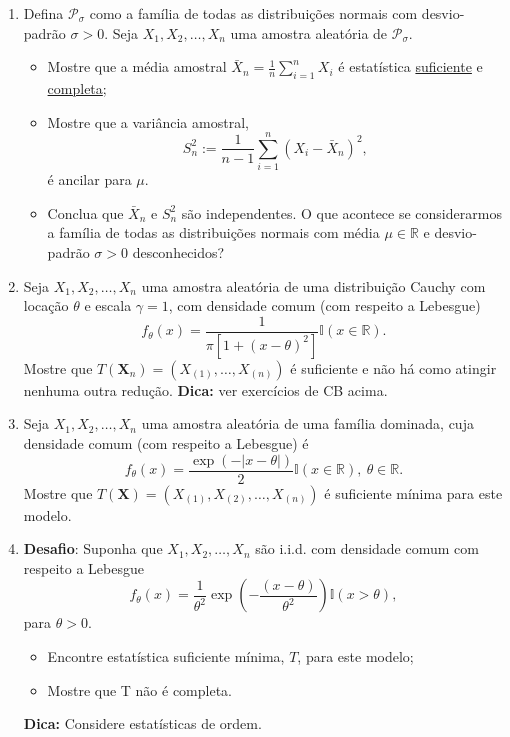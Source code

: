 \documentclass[a4paper,10pt, notitlepage]{report}
\newcommand{\rs}{X_1, X_2, \ldots, X_n} %
\newcommand{\ods}{X_{(1)}, X_{(2)}, \ldots, X_{(n)} } %
\newcommand{\bX}{\boldsymbol{X}} %
\begin{document}
\begin{enumerate}
    \item Defina $\mathcal{P}_\sigma$ como a família de todas as distribuições normais com desvio-padrão $\sigma >0$. Seja $\rs$ uma amostra aleatória de $\mathcal{P}_\sigma$.
    \begin{itemize}
        \item Mostre que a média amostral $\bar{X}_n = \frac{1}{n}\sum_{i=1}^n X_i$ é estatística \underline{suficiente} e \underline{completa};
        \item Mostre que a variância amostral,
        $$S_n^2 := \frac{1}{n-1} \sum_{i=1}^n \left(X_i - \bar{X}_n\right)^2,$$
        é ancilar para $\mu$.
        \item Conclua que $\bar{X}_n$ e $S_n^2$ são independentes. O que acontece se considerarmos a família de todas as distribuições normais com média $\mu \in \mathbb{R}$ e desvio-padrão $\sigma >0$ desconhecidos?
    \end{itemize}
    \item Seja $\rs$ uma amostra aleatória de uma distribuição Cauchy com locação $\theta$ e escala $\gamma = 1$, com densidade comum (com respeito a Lebesgue)
    $$ f_\theta(x) = \frac{1}{\pi [ 1 +  (x-\theta)^2]}\mathbb{I}(x \in \mathbb{R}).$$
    Mostre que $T(\bX_n) = (X_{(1)}, \ldots, X_{(n)})$ é suficiente e não há como atingir nenhuma outra redução. \textbf{Dica:} ver exercícios de CB acima. 
    \item Seja $\rs$ uma amostra aleatória de uma família dominada, cuja densidade comum (com respeito a Lebesgue) é  $$ f_\theta(x) = \frac{\exp(-|x-\theta|)}{2}\mathbb{I}(x \in \mathbb{R}), \: \theta \in \mathbb{R}.$$
    Mostre que $T(\bX) = (\ods)$ é suficiente mínima para este modelo.
    \item \textbf{Desafio}:
 Suponha que $\rs$ são i.i.d. com densidade comum com respeito a Lebesgue 
 $$ f_\theta(x) = \frac{1}{\theta^2} \exp \left(-\frac{(x-\theta)}{\theta^2}\right)\mathbb{I}(x > \theta),$$
 para $\theta>0$.
    \begin{itemize}
        \item Encontre estatística suficiente mínima, $T$, para este modelo;
        \item Mostre que T não é completa.
    \end{itemize}
    \textbf{Dica:} Considere estatísticas de ordem.
\end{enumerate}



% 
% 
\end{document}
